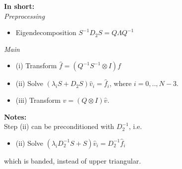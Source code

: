 \documentclass[10pt,a4paper]{article}
\begin{document}
\textbf{In short:}\\

\textit{Preprocessing}
\begin{itemize}
\item Eigendecomposition $S^{-1} D_2 S = Q \Lambda Q^{-1}$
\end{itemize}

\textit{Main}
\begin{itemize}
\item (i) Transform $\widehat{f} = (Q^{-1} S^{-1} \otimes I)f$
\item (ii) Solve $(\lambda_i  S +  D_2 S) \widehat{v}_i = \widehat{f}_i$, where $i=0,..,N-3$.
\item (iii) Transform $v = (Q \otimes I) \widehat{v}$.
\end{itemize}

\textbf{Notes:}\\

Step (ii) can be preconditioned with $D_2^{-1}$, i.e.
\begin{itemize}
\item (ii) Solve $(\lambda_i  D_2^{-1}S +  S) \widehat{v}_i = D_2^{-1}\widehat{f}_i$
\end{itemize}

which is banded, instead of upper triangular.
\end{document}
